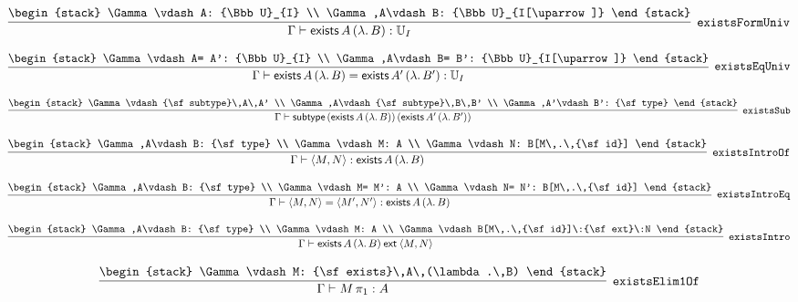 \[
\infer[{\tt existsFormUniv}]{\Gamma \vdash {\sf exists}\,A\,(\lambda .\,B): {\Bbb U}_{I}}{
\begin{stack}
\Gamma \vdash A: {\Bbb U}_{I}
\\
\Gamma ,A\vdash B: {\Bbb U}_{I[\uparrow ]}
\end{stack}}
\]

\[
\infer[{\tt existsEqUniv}]{\Gamma \vdash {\sf exists}\,A\,(\lambda .\,B)= {\sf exists}\,A'\,(\lambda .\,B'): {\Bbb U}_{I}}{
\begin{stack}
\Gamma \vdash A= A': {\Bbb U}_{I}
\\
\Gamma ,A\vdash B= B': {\Bbb U}_{I[\uparrow ]}
\end{stack}}
\]

\[
\infer[{\tt existsSub}]{\Gamma \vdash {\sf subtype}\,({\sf exists}\,A\,(\lambda .\,B))\,({\sf exists}\,A'\,(\lambda .\,B'))}{
\begin{stack}
\Gamma \vdash {\sf subtype}\,A\,A'
\\
\Gamma ,A\vdash {\sf subtype}\,B\,B'
\\
\Gamma ,A'\vdash B': {\sf type}
\end{stack}}
\]

\[
\infer[{\tt existsIntroOf}]{\Gamma \vdash \langle M,N\rangle : {\sf exists}\,A\,(\lambda .\,B)}{
\begin{stack}
\Gamma ,A\vdash B: {\sf type}
\\
\Gamma \vdash M: A
\\
\Gamma \vdash N: B[M\,.\,{\sf id}]
\end{stack}}
\]

\[
\infer[{\tt existsIntroEq}]{\Gamma \vdash \langle M,N\rangle = \langle M',N'\rangle : {\sf exists}\,A\,(\lambda .\,B)}{
\begin{stack}
\Gamma ,A\vdash B: {\sf type}
\\
\Gamma \vdash M= M': A
\\
\Gamma \vdash N= N': B[M\,.\,{\sf id}]
\end{stack}}
\]

\[
\infer[{\tt existsIntro}]{\Gamma \vdash {\sf exists}\,A\,(\lambda .\,B)\:{\sf ext}\:\langle M,N\rangle }{
\begin{stack}
\Gamma ,A\vdash B: {\sf type}
\\
\Gamma \vdash M: A
\\
\Gamma \vdash B[M\,.\,{\sf id}]\:{\sf ext}\:N
\end{stack}}
\]

\[
\infer[{\tt existsElim1Of}]{\Gamma \vdash M\, \pi_1: A}{
\begin{stack}
\Gamma \vdash M: {\sf exists}\,A\,(\lambda .\,B)
\end{stack}}
\]


